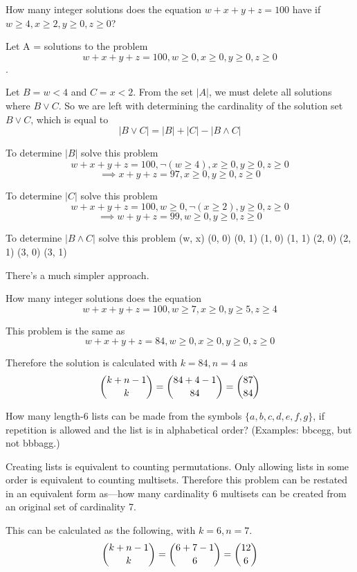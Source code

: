 \documentclass[openany, 12pt]{book}
\begin{document}
\begin{exercise}{}{}
	How many integer solutions does the equation
	$w + x + y+ z = 100$ have if $w \geq 4, x \geq 2, y \geq 0, z \geq 0$?
	\begin{alist}
		\item Let A = solutions to the problem
		$$w + x + y+ z = 100, w \geq 0, x \geq 0, y \geq 0, z \geq 0$$.
		\item Let $B=w<4$ and $C=x<2$. From the set $|A|$, we must delete all solutions
		where $B\lor C$. So we are left with determining the cardinality of the
		solution set $B \lor C$, which is equal to
		$$
			|B\lor C| = |B| + |C| - |B\land C|
		$$
		\item To determine $|B|$ solve this problem
		$$w + x + y+ z = 100, \neg(w \geq 4), x \geq 0, y \geq 0, z \geq 0$$
		$$\implies x + y+ z = 97, x \geq 0, y \geq 0, z \geq 0$$

		\item To determine $|C|$ solve this problem
		$$w + x + y+ z = 100, w \geq 0, \neg(x \geq 2), y \geq 0, z \geq 0$$
		$$\implies w + y+ z = 99, w \geq 0, y \geq 0, z \geq 0$$

		\item To determine $|B\land C|$ solve this problem
		(w, x)
		(0, 0)
		(0, 1)
		(1, 0)
		(1, 1)
		(2, 0)
		(2, 1)
		(3, 0)
		(3, 1)
		\item There's a much simpler approach.
	\end{alist}
\end{exercise}

\begin{exercise}{}{}
	How many integer solutions does the equation
	$$w + x + y+ z = 100, w \geq 7, x \geq 0, y \geq 5, z \geq 4$$
	\begin{alist}
		\item This problem is the same as
		$$w + x + y+ z = 84, w \geq 0, x \geq 0, y \geq 0, z \geq 0$$
		\item Therefore the solution is calculated with $k=84, n=4$ as
		$$ \dbinom{k+n-1}{k} = \dbinom{84+4-1}{84}=\dbinom{87}{84}$$
	\end{alist}
\end{exercise}

\begin{exercise}{}{}
	How many length-6 lists can be made from the symbols $\{a,
		b, c, d, e, f, g\}$, if repetition is allowed and the list is in
	alphabetical order? (Examples: bbcegg, but not bbbagg.)
	\begin{alist}
		\item Creating lists is equivalent to counting permutations. Only allowing lists
		in some order is equivalent to counting multisets. Therefore this problem
		can be restated in an equivalent form as---how many cardinality 6 multisets
		can be created from an original set of cardinality 7.
		\item This can be calculated as the following, with $k=6, n=7$.
		$$ \dbinom{k+n-1}{k} = \dbinom{6+7-1}{6}=\dbinom{12}{6}$$
	\end{alist}
\end{exercise}
\end{document}
